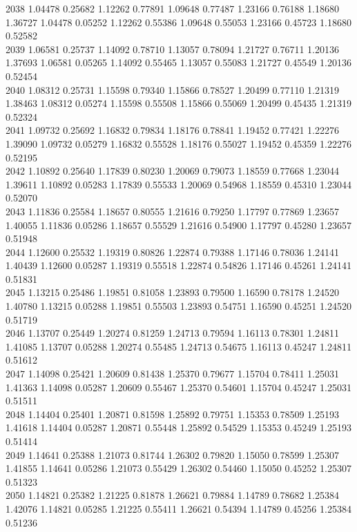 {2038 1.04478 0.25682 1.12262 0.77891 1.09648 0.77487 1.23166 0.76188 1.18680 1.36727 1.04478 0.05252 1.12262 0.55386 1.09648 0.55053 1.23166 0.45723 1.18680 0.52582 \\
2039 1.06581 0.25737 1.14092 0.78710 1.13057 0.78094 1.21727 0.76711 1.20136 1.37693 1.06581 0.05265 1.14092 0.55465 1.13057 0.55083 1.21727 0.45549 1.20136 0.52454 \\
2040 1.08312 0.25731 1.15598 0.79340 1.15866 0.78527 1.20499 0.77110 1.21319 1.38463 1.08312 0.05274 1.15598 0.55508 1.15866 0.55069 1.20499 0.45435 1.21319 0.52324 \\
2041 1.09732 0.25692 1.16832 0.79834 1.18176 0.78841 1.19452 0.77421 1.22276 1.39090 1.09732 0.05279 1.16832 0.55528 1.18176 0.55027 1.19452 0.45359 1.22276 0.52195 \\
2042 1.10892 0.25640 1.17839 0.80230 1.20069 0.79073 1.18559 0.77668 1.23044 1.39611 1.10892 0.05283 1.17839 0.55533 1.20069 0.54968 1.18559 0.45310 1.23044 0.52070 \\
2043 1.11836 0.25584 1.18657 0.80555 1.21616 0.79250 1.17797 0.77869 1.23657 1.40055 1.11836 0.05286 1.18657 0.55529 1.21616 0.54900 1.17797 0.45280 1.23657 0.51948 \\
2044 1.12600 0.25532 1.19319 0.80826 1.22874 0.79388 1.17146 0.78036 1.24141 1.40439 1.12600 0.05287 1.19319 0.55518 1.22874 0.54826 1.17146 0.45261 1.24141 0.51831 \\
2045 1.13215 0.25486 1.19851 0.81058 1.23893 0.79500 1.16590 0.78178 1.24520 1.40780 1.13215 0.05288 1.19851 0.55503 1.23893 0.54751 1.16590 0.45251 1.24520 0.51719 \\
2046 1.13707 0.25449 1.20274 0.81259 1.24713 0.79594 1.16113 0.78301 1.24811 1.41085 1.13707 0.05288 1.20274 0.55485 1.24713 0.54675 1.16113 0.45247 1.24811 0.51612 \\
2047 1.14098 0.25421 1.20609 0.81438 1.25370 0.79677 1.15704 0.78411 1.25031 1.41363 1.14098 0.05287 1.20609 0.55467 1.25370 0.54601 1.15704 0.45247 1.25031 0.51511 \\
2048 1.14404 0.25401 1.20871 0.81598 1.25892 0.79751 1.15353 0.78509 1.25193 1.41618 1.14404 0.05287 1.20871 0.55448 1.25892 0.54529 1.15353 0.45249 1.25193 0.51414 \\
2049 1.14641 0.25388 1.21073 0.81744 1.26302 0.79820 1.15050 0.78599 1.25307 1.41855 1.14641 0.05286 1.21073 0.55429 1.26302 0.54460 1.15050 0.45252 1.25307 0.51323 \\
2050 1.14821 0.25382 1.21225 0.81878 1.26621 0.79884 1.14789 0.78682 1.25384 1.42076 1.14821 0.05285 1.21225 0.55411 1.26621 0.54394 1.14789 0.45256 1.25384 0.51236 \\
}
